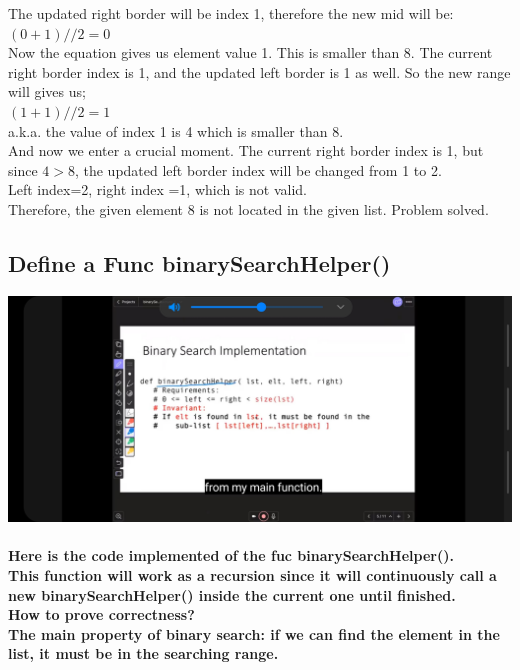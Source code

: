 \documentclass{article}
\begin{document}
{The updated right border will be index 1, therefore the new mid will be:\\
$(0 + 1) // 2 = 0$\\
Now the equation gives us element value 1. This is smaller than 8. The current right border index is 1, and the updated left border is 1 as well. So the new range will gives us;\\
$(1 + 1) // 2 = 1$\\
a.k.a. the value of index 1 is 4 which is smaller than 8.\\
And now we enter a crucial moment. The current right border index is 1, but since $4 > 8$, the updated left border index will be changed from 1 to 2.\\
Left index=2, right index =1, which is not valid.\\
Therefore, the given element 8 is not located in the given list. Problem solved.}

\subsection{Define a Func binarySearchHelper()}

\includegraphics[width=\textwidth]{binarysearchhelper}



\paragraph{Here is the code implemented of the fuc binarySearchHelper().\\
This function will work as a recursion since it will continuously call a new binarySearchHelper() inside the current one until finished.\\
How to prove correctness?\\
The main property of binary search: if we can find the element in the list, it must be in the searching range.}
\end{document}
